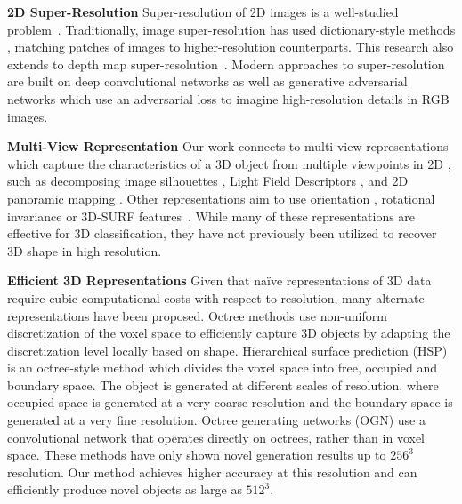 \documentclass{article}
\begin{document}
\textbf{2D Super-Resolution} \quad Super-resolution of 2D images is a well-studied problem~\cite{park2003super}. 
Traditionally, image super-resolution has used dictionary-style methods \cite{freeman2002example, yang2010image}, matching patches of images to higher-resolution counterparts. This research also extends to depth map super-resolution~\cite{mac2012patch, park2011high,MSNET}. Modern approaches to super-resolution are built on deep convolutional networks \cite{dong2016image, wang2015deep, osendorfer2014image} as well as generative adversarial networks \cite{SRGAN,karras2018progressive} which use an adversarial loss to imagine high-resolution details in RGB images.

\textbf{Multi-View Representation} \quad Our work connects to multi-view representations which capture the characteristics of a 3D object from multiple viewpoints in 2D \cite{koenderink1976singularities, murase1995visual, su2015multi, qi2016volumetric, kar2017learning, shin2018pixels, Riegler2017OctNetFusion}, such as decomposing image silhouettes \cite{macrini2002view,3DVAE}, Light Field Descriptors \cite{chen2003visual}, and 2D panoramic mapping \cite{shi2015deeppano}. 
Other representations aim to use orientation \cite{saxena2009make3d}, rotational invariance \cite{kazhdan2003rotation} or 3D-SURF features~\cite{knopp2010hough}. While many of these representations are effective for 3D classification,
they have not previously been utilized to recover 3D shape in high resolution.


\textbf{Efficient 3D Representations} \quad Given that na\"ive representations of 3D data require cubic computational costs with respect to resolution, many alternate representations have been proposed. Octree methods \cite{OGN, HSP} use non-uniform discretization of the voxel space to efficiently capture 3D objects by adapting the discretization level locally based on shape. Hierarchical surface prediction (HSP)~\cite{HSP} is an octree-style method which divides the voxel space into free, occupied and boundary space. The object is generated at different scales of resolution, where occupied space is generated at a very coarse resolution and the boundary space is generated at a very fine resolution. Octree generating networks (OGN) \cite{OGN} use a convolutional network that operates directly on octrees, rather than in voxel space. These methods have only shown novel generation results up to $256^3$ resolution. Our method achieves higher accuracy at this resolution and can efficiently produce novel objects as large as $512^3$.
\end{document}
